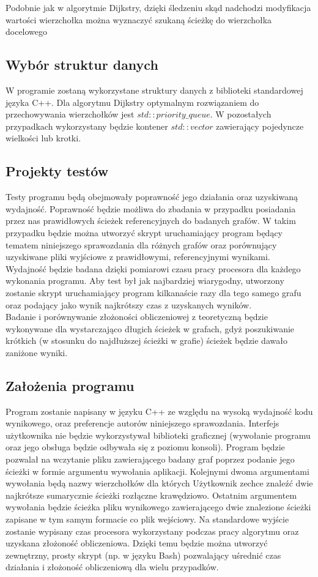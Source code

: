 \documentclass[a4paper,12pt]{article}
\newcommand\tab[1][1cm]{\hspace*{#1}}
\begin{document}
Podobnie jak w algorytmie Dijkstry, dzięki śledzeniu skąd nadchodzi modyfikacja wartości wierzchołka można wyznaczyć szukaną ścieżkę do wierzchołka docelowego



\subsection{Wybór struktur danych}
\tab
W programie zostaną wykorzystane struktury danych z biblioteki standardowej języka C++. Dla algorytmu Dijkstry optymalnym rozwiązaniem do przechowywania wierzchołków jest $std::priority\_queue$. W pozostałych przypadkach wykorzystany będzie kontener $std::vector$ zawierający pojedyncze wielkości lub krotki.

\subsection{Projekty testów}
\tab
Testy programu będą obejmowały poprawność jego działania oraz uzyskiwaną wydajność. Poprawność będzie możliwa do zbadania w przypadku posiadania przez nas prawidłowych ścieżek referencyjnych do badanych grafów. W takim przypadku będzie można utworzyć skrypt uruchamiający program będący tematem niniejszego sprawozdania dla różnych grafów oraz porównujący uzyskiwane pliki wyjściowe z prawidłowymi, referencyjnymi wynikami.\\
\tab
Wydajność będzie badana dzięki pomiarowi czasu pracy procesora dla każdego wykonania programu. Aby test był jak najbardziej wiarygodny, utworzony zostanie skrypt uruchamiający program kilkanaście razy dla tego samego grafu oraz podający jako wynik najkrótszy czas z uzyskanych wyników.\\
\tab
Badanie i porównywanie złożoności obliczeniowej z teoretyczną będzie wykonywane dla wystarczająco długich ścieżek w grafach, gdyż poszukiwanie krótkich (w stosunku do najdłuższej ścieżki w grafie) ścieżek będzie dawało zaniżone wyniki.

\subsection{Założenia programu}
\tab
Program zostanie napisany w języku C++ ze względu na wysoką wydajność kodu wynikowego, oraz preferencje autorów niniejszego sprawozdania. Interfejs użytkownika nie będzie wykorzystywał biblioteki graficznej (wywołanie programu oraz jego obsługa będzie odbywała się z poziomu konsoli). Program będzie pozwalał na wczytanie pliku zawierającego badany graf poprzez podanie jego ścieżki w formie argumentu wywołania aplikacji. Kolejnymi dwoma argumentami wywołania będą nazwy wierzchołków dla których Użytkownik zechce znaleźć dwie najkrótsze sumarycznie ścieżki rozłączne krawędziowo. Ostatnim argumentem wywołania będzie ścieżka pliku wynikowego zawierającego dwie znalezione ścieżki zapisane w tym samym formacie co plik wejściowy. Na standardowe wyjście zostanie wypisany czas procesora wykorzystany podczas pracy algorytmu oraz uzyskana złożoność obliczeniowa. Dzięki temu będzie można utworzyć zewnętrzny, prosty skrypt (np. w języku Bash) pozwalający uśrednić czas działania i złożoność obliczeniową dla wielu przypadków.
\end{document}
